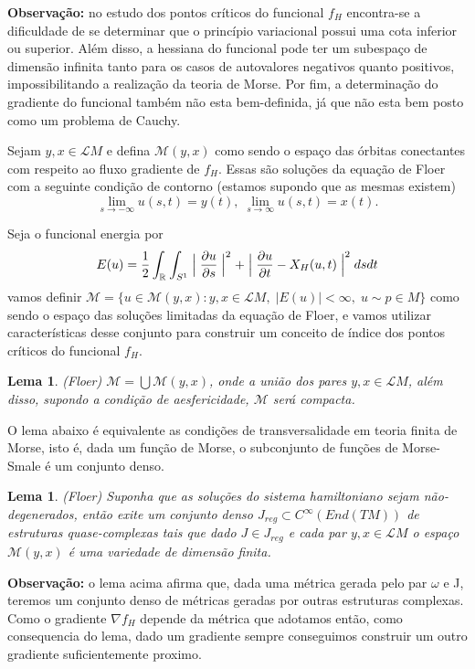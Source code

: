 \documentclass[12pt]{book}
\newtheorem{lema}[teorema]{Lema}
\newcommand{\bigmodulo}[1]{\Bigm\lvert #1 \Bigm\lvert }
\newcommand{\derivadaparcial}[2]{\frac{\partial #1}{\partial #2}}
\newcommand{\real}[1]{\mathbb{R}^{#1}}
\newcommand{\solucoesperiodicascontrateis}{\mathcal{L}M}
\newcommand{\vermelho}[1]{{\color{red}#1}}
\begin{document}
	\textbf{Observação:} no estudo dos pontos críticos do funcional $f_{H}$ encontra-se a dificuldade de se determinar que o princípio variacional possui uma cota inferior ou superior. Além disso, a hessiana do funcional pode ter um subespaço de dimensão infinita tanto para os casos de autovalores negativos quanto positivos, impossibilitando a realização da teoria de Morse. Por fim, \vermelho{a determinação do gradiente do funcional também não esta bem-definida, já que não esta bem posto como um problema de Cauchy.}
	
	Sejam $y, x\in \solucoesperiodicascontrateis$ e defina $\mathcal{M}(y, x)$ como sendo o espaço das órbitas conectantes com respeito ao fluxo gradiente de $f_{H}$. Essas são soluções da equação de Floer com a seguinte condição de contorno \vermelho{(estamos supondo que as mesmas existem)}
	$$
	\lim_{s\to -\infty} u(s,t) = y(t), \; 	\lim_{s\to \infty} u(s,t) = x(t). 
	$$
	
	Seja o funcional energia por
	$$
	E(u) = \frac{1}{2}\int_{\real{}} \int_{S{^{1}}} \bigmodulo{\derivadaparcial{u}{s}}^{2} + \bigmodulo{\derivadaparcial{u}{t} - X_{H}(u,t)}^{2}dsdt
	$$
	vamos definir $
	\mathcal{M} = \{u \in \mathcal{M}(y,x):y,x \in \solucoesperiodicascontrateis,\; |E(u)| < \infty, \; u \sim p \in M\}
	$ como sendo o espaço das soluções limitadas da equação de Floer, e vamos utilizar características desse conjunto para construir um conceito de índice dos pontos críticos do funcional $f_{H}$.
	
	\begin{lema}
		(Floer) $\mathcal{M} = \bigcup \mathcal{M}(y,x)$, onde a união dos pares $y,x \in \solucoesperiodicascontrateis$, além disso, supondo a condição de aesfericidade, $\mathcal{M}$ será compacta.
	\end{lema}
	
	O lema abaixo é equivalente as condições de transversalidade em teoria finita de Morse, isto é, dada um função de Morse, o subconjunto de funções de Morse-Smale é um conjunto denso.
	
	\begin{lema}
		(Floer) Suponha que as soluções do sistema hamiltoniano sejam não-degenerados, então exite um conjunto denso $J_{reg} \subset C^{\infty}(End(TM))$ de estruturas quase-complexas tais que dado $J \in J_{reg}$ e cada par $y,x \in \solucoesperiodicascontrateis$ o espaço $\mathcal{M}(y,x)$ é uma variedade de dimensão finita.
	\end{lema}
	
	\textbf{Observação:} o lema acima afirma que, dada uma métrica gerada pelo par $\omega$ e J, teremos um conjunto denso de métricas geradas por outras estruturas complexas. Como o gradiente $\nabla f_{H}$ depende da métrica que adotamos então, como consequencia do lema, dado um gradiente sempre conseguimos construir um outro gradiente suficientemente proximo.
	
\end{document}
